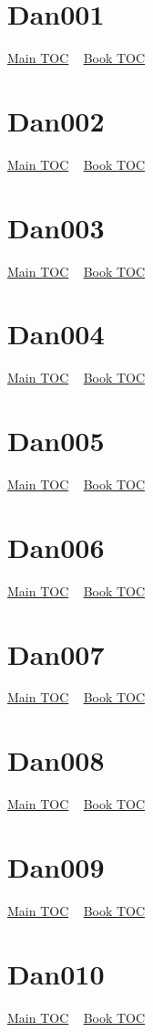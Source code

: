 \documentclass{book}
\begin{document}
  \section{Dan001}\hyperlink{toc}{Main TOC} ~ \hyperref[subsec:Dan]{Book TOC} 
  \section{Dan002}\hyperlink{toc}{Main TOC} ~ \hyperref[subsec:Dan]{Book TOC} 
  \section{Dan003}\hyperlink{toc}{Main TOC} ~ \hyperref[subsec:Dan]{Book TOC} 
  \section{Dan004}\hyperlink{toc}{Main TOC} ~ \hyperref[subsec:Dan]{Book TOC} 
  \section{Dan005}\hyperlink{toc}{Main TOC} ~ \hyperref[subsec:Dan]{Book TOC} 
  \section{Dan006}\hyperlink{toc}{Main TOC} ~ \hyperref[subsec:Dan]{Book TOC} 
  \section{Dan007}\hyperlink{toc}{Main TOC} ~ \hyperref[subsec:Dan]{Book TOC} 
  \section{Dan008}\hyperlink{toc}{Main TOC} ~ \hyperref[subsec:Dan]{Book TOC} 
  \section{Dan009}\hyperlink{toc}{Main TOC} ~ \hyperref[subsec:Dan]{Book TOC} 
  \section{Dan010}\hyperlink{toc}{Main TOC} ~ \hyperref[subsec:Dan]{Book TOC} 
\end{document}
